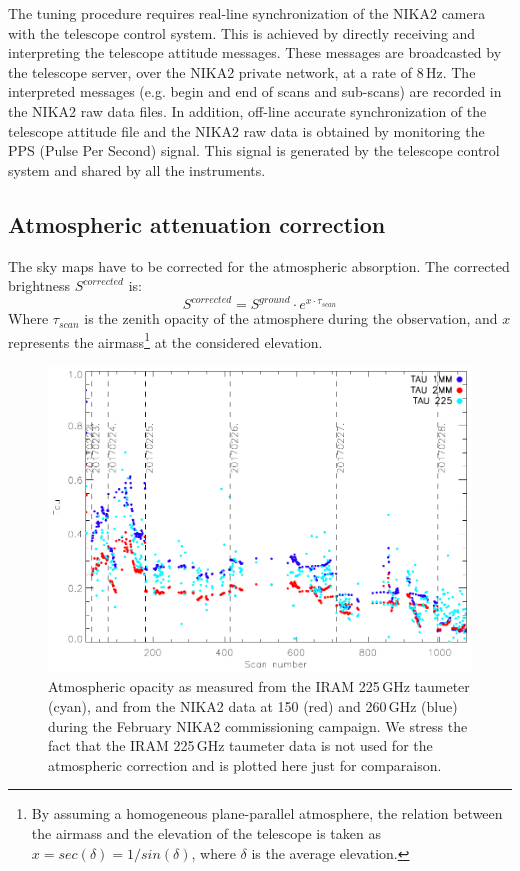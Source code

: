 \documentclass[]{aa} %
\begin{document}
The tuning procedure requires real-line synchronization of the NIKA2 camera with the telescope control system. This is achieved by directly receiving and interpreting the telescope attitude messages. These messages are broadcasted by the telescope server, over the NIKA2 private network, at a rate of 8\,Hz. The interpreted messages (e.g. begin and end of scans and sub-scans) are recorded in the NIKA2 raw data files. In addition, off-line accurate synchronization of the telescope attitude file and the NIKA2 raw data is obtained by monitoring the PPS (Pulse Per Second) signal. This signal is generated by the telescope control system and shared by all the instruments.


\subsection{Atmospheric attenuation correction}
\label{Atmospheric attenuation correction}


The sky maps have to be corrected for the atmospheric absorption. The corrected brightness $S^{corrected}$ is:
\begin{equation}\label{eq:opa}
S^{corrected} =  S^{ground} \cdot e^{ x \cdot \tau_{scan}}
\end{equation}
Where $\tau_{scan}$ is the zenith opacity of the atmosphere during the
observation, and $x$ represents the airmass\footnote{By assuming a
  homogeneous plane-parallel atmosphere, the relation between the
  airmass and the elevation of the telescope is taken as $x =
  sec(\delta)=1/sin(\delta)$, where $\delta$ is the average
  elevation.} at the considered elevation.

\begin{figure}
\includegraphics[scale=0.55]{./opacity_evol_run22.pdf}
\caption{Atmospheric opacity as measured from the IRAM 225\,GHz taumeter (cyan), and from the NIKA2 data at 150 (red) and 260\,GHz (blue) during the February NIKA2 commissioning campaign.
 We stress the fact that the IRAM 225\,GHz taumeter data is not used for the atmospheric correction and is plotted here just for comparaison.
  \label{fig:taumeas}}
\end{figure}
\end{document}
